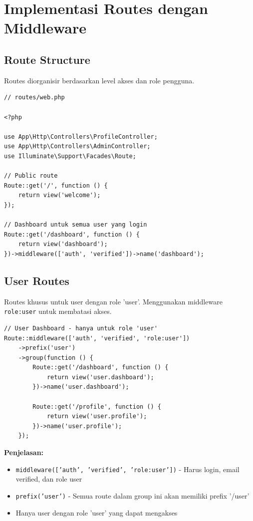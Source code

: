 \documentclass[a4paper,oneside,11pt]{book}
\begin{document}
\section{Implementasi Routes dengan Middleware}

\subsection{Route Structure}
Routes diorganisir berdasarkan level akses dan role pengguna.

\begin{lstlisting}[style=phpstyle]
// routes/web.php

<?php

use App\Http\Controllers\ProfileController;
use App\Http\Controllers\AdminController;
use Illuminate\Support\Facades\Route;

// Public route
Route::get('/', function () {
    return view('welcome');
});

// Dashboard untuk semua user yang login
Route::get('/dashboard', function () {
    return view('dashboard');
})->middleware(['auth', 'verified'])->name('dashboard');
\end{lstlisting}

\subsection{User Routes}
Routes khusus untuk user dengan role 'user'. Menggunakan middleware \texttt{role:user} untuk membatasi akses.

\begin{lstlisting}[style=phpstyle]
// User Dashboard - hanya untuk role 'user'
Route::middleware(['auth', 'verified', 'role:user'])
    ->prefix('user')
    ->group(function () {
        Route::get('/dashboard', function () {
            return view('user.dashboard');
        })->name('user.dashboard');
        
        Route::get('/profile', function () {
            return view('user.profile');
        })->name('user.profile');
    });
\end{lstlisting}

\textbf{Penjelasan:}
\begin{itemize}
    \item \texttt{middleware(['auth', 'verified', 'role:user'])} - Harus login, email verified, dan role user
    \item \texttt{prefix('user')} - Semua route dalam group ini akan memiliki prefix '/user'
    \item Hanya user dengan role 'user' yang dapat mengakses
\end{itemize}
\end{document}
